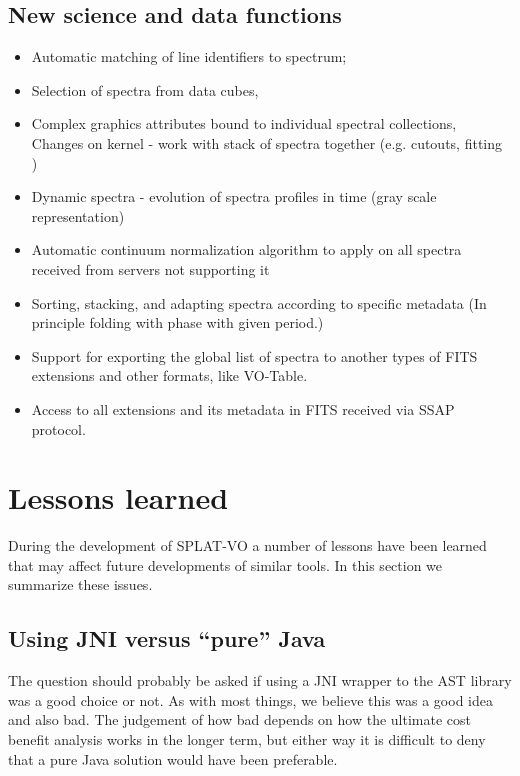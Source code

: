 \documentclass[final,authoryear,5p,times,twocolumn]{elsarticle}
\begin{document}
\subsection{New science and data functions}
\begin{itemize}
\item Automatic matching of line identifiers to spectrum;
\item Selection of spectra from data cubes,
\item Complex graphics attributes bound to individual spectral collections, Changes on kernel - work with stack of spectra together (e.g. cutouts, fitting )
\item Dynamic spectra - evolution of spectra profiles in time (gray scale representation)
\item Automatic continuum normalization algorithm to apply on all spectra received from servers not supporting it
\item Sorting, stacking, and adapting spectra according to specific metadata (In principle folding with phase with given period.)
\item Support for exporting the global list of spectra to another types of FITS extensions and other formats, like VO-Table.
\item Access to all extensions and its metadata in FITS received via SSAP protocol.

\end{itemize}

\section{Lessons learned}

During the development of SPLAT-VO a number of lessons have been
learned that may affect future developments of similar tools. In this
section we summarize these issues.

\subsection{Using JNI versus ``pure'' Java}

The question should probably be asked if using a JNI wrapper to the
AST library was a good choice or not. As with most things, we believe
this was a good idea and also bad. The judgement of how bad depends on
how the ultimate cost benefit analysis works in the longer term, but
either way it is difficult to deny that a pure Java solution would
have been preferable.
\end{document}
